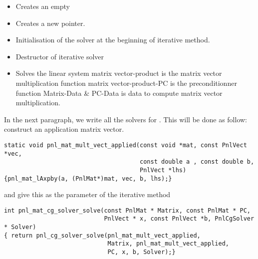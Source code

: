 \begin{itemize}
  \item {}
    \sshortdescribe Creates an empty   
\item {}
  \sshortdescribe Creates a new  pointer.  
\item {}
  \sshortdescribe Initialisation of the solver at the beginning of iterative method.  
\item {}
  \sshortdescribe Destructor of iterative solver  
\item {}
  \sshortdescribe Solves the linear system matrix vector-product is the matrix vector multiplication function matrix vector-product-PC is the preconditionner function Matrix-Data \& PC-Data is data to compute matrix vector multiplication.  
\end{itemize}


In the next paragraph, we write all the solvers for . This will be done as
follow: construct an application matrix vector.
\begin{verbatim}
static void pnl_mat_mult_vect_applied(const void *mat, const PnlVect *vec, 
                                      const double a , const double b, 
                                      PnlVect *lhs)
{pnl_mat_lAxpby(a, (PnlMat*)mat, vec, b, lhs);}
\end{verbatim}
and give this as the parameter of the iterative method
\begin{verbatim}
int pnl_mat_cg_solver_solve(const PnlMat * Matrix, const PnlMat * PC, 
                            PnlVect * x, const PnlVect *b, PnlCgSolver * Solver)
{ return pnl_cg_solver_solve(pnl_mat_mult_vect_applied, 
                             Matrix, pnl_mat_mult_vect_applied, 
                             PC, x, b, Solver);}
\end{verbatim}

